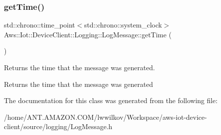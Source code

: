 \subsubsection{\texorpdfstring{get\+Time()}{getTime()}}
{\footnotesize\ttfamily std\+::chrono\+::time\+\_\+point$<$std\+::chrono\+::system\+\_\+clock$>$ Aws\+::\+Iot\+::\+Device\+Client\+::\+Logging\+::\+Log\+Message\+::get\+Time (\begin{DoxyParamCaption}{ }\end{DoxyParamCaption})\hspace{0.3cm}{\ttfamily [inline]}}



Returns the time that the message was generated. 

\begin{DoxyReturn}{Returns}
the time that the message was generated 
\end{DoxyReturn}


The documentation for this class was generated from the following file\+:\begin{DoxyCompactItemize}
\item 
/home/\+A\+N\+T.\+A\+M\+A\+Z\+O\+N.\+C\+O\+M/lwwilkov/\+Workspace/aws-\/iot-\/device-\/client/source/logging/Log\+Message.\+h\end{DoxyCompactItemize}
